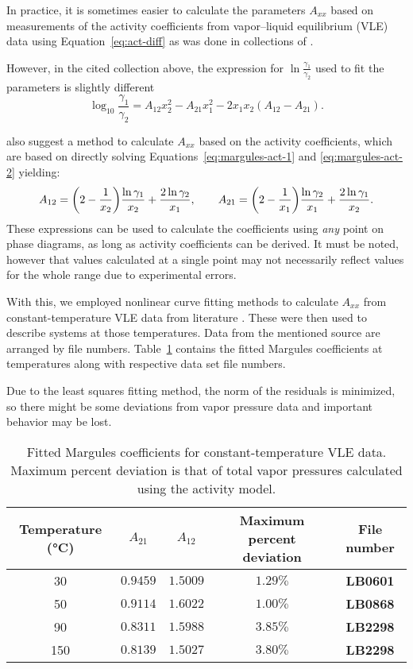 In practice, it is sometimes easier to calculate the parameters $A_{xx}$ based on
measurements of the activity coefficients from vapor--liquid equilibrium (VLE) data 
using Equation~\ref{eq:act-diff} as was done in collections of .

However, in the cited collection above, the expression for 
$\ln\frac{\gamma_1}{\gamma_2}$ used to fit the parameters is slightly different
\[
    \log_{10} \dfrac{\gamma_1}{\gamma_2} =  A_{12}x_2^2 - A_{21}x_1^2 - 2x_1x_2
    (A_{12} - A_{21}).
\]

 also suggest a method to calculate $A_{xx}$
based on the activity coefficients, which are based on directly solving
Equations~\ref{eq:margules-act-1} and \ref{eq:margules-act-2} yielding:
\[
    A_{12} = \qty(2 - \frac1{x_2}) \dfrac{\ln\gamma_1}{x_2} + 
    \dfrac{2\ln\gamma_2}{x_1},\qquad
    A_{21} = \qty(2 - \frac1{x_1}) \dfrac{\ln\gamma_2}{x_1} + 
    \dfrac{2\ln\gamma_1}{x_2}.
\]
These expressions can be used to calculate the coefficients using \textit{any} point
on phase diagrams, as long as activity coefficients can be derived. It must be noted,
however that values calculated at a single point may not necessarily 
reflect values for the whole range due to experimental errors.

With this, we employed nonlinear curve fitting methods to calculate $A_{xx}$ from 
constant-temperature VLE data from literature \cite{wichtdat}. 
These were then used to describe systems at those temperatures.
Data from the mentioned source are arranged by file numbers. Table~\ref{tab:fits}
contains the fitted Margules coefficients at temperatures along with respective 
data set file numbers.

Due to the least squares fitting method, the norm of the residuals is
minimized, so there might be some deviations from vapor pressure data and 
important behavior may be lost.

\begin{table}[ht]
    \centering
    \caption{Fitted Margules coefficients for constant-temperature VLE data.
    Maximum percent deviation is that of total vapor pressures calculated using
    the activity model.}
    \medskip
    \begin{tabular}{c|cc|c|c}
        Temperature (\si{\celsius}) & $A_{21}$ & $A_{12}$ & Maximum 
        percent deviation & File number \\ \hline
        \num{30} & $0.9459$ & $1.5009$ & $1.29\%$ & \textbf{LB0601} \\
        \num{50} & $0.9114$ & $1.6022$ & $1.00\%$ & \textbf{LB0868} \\
        \num{90} & $0.8311$ & $1.5988$ & $3.85\%$ & \textbf{LB2298} \\
        \num{150} & $0.8139$ & $1.5027$ & $3.80\%$ & \textbf{LB2298}
    \end{tabular}
    \label{tab:fits}
\end{table}
